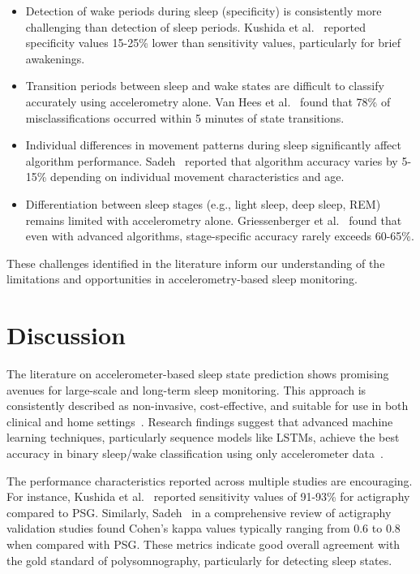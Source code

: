 \documentclass[conference]{IEEEtran}
\begin{document}
\begin{itemize}
	\item Detection of wake periods during sleep (specificity) is consistently more challenging than detection of sleep periods. Kushida et al.~\cite{kushida2001} reported specificity values 15-25\% lower than sensitivity values, particularly for brief awakenings.

	\item Transition periods between sleep and wake states are difficult to classify accurately using accelerometry alone. Van Hees et al.~\cite{vanHees2015} found that 78\% of misclassifications occurred within 5 minutes of state transitions.

	\item Individual differences in movement patterns during sleep significantly affect algorithm performance. Sadeh~\cite{sadeh2011} reported that algorithm accuracy varies by 5-15\% depending on individual movement characteristics and age.

	\item Differentiation between sleep stages (e.g., light sleep, deep sleep, REM) remains limited with accelerometry alone. Griessenberger et al.~\cite{griessenberger2013} found that even with advanced algorithms, stage-specific accuracy rarely exceeds 60-65\%.
\end{itemize}

These challenges identified in the literature inform our understanding of the limitations and opportunities in accelerometry-based sleep monitoring.

\section{Discussion}

The literature on accelerometer-based sleep state prediction shows promising avenues for large-scale and long-term sleep monitoring. This approach is consistently described as non-invasive, cost-effective, and suitable for use in both clinical and home settings~\cite{pmc4883440, researchgate2021, sadeh2011, littner2003}. Research findings suggest that advanced machine learning techniques, particularly sequence models like LSTMs, achieve the best accuracy in binary sleep/wake classification using only accelerometer data~\cite{zhang2020machine, behar2013}.

The performance characteristics reported across multiple studies are encouraging. For instance, Kushida et al.~\cite{kushida2001} reported sensitivity values of 91-93\% for actigraphy compared to PSG. Similarly, Sadeh~\cite{sadeh2011} in a comprehensive review of actigraphy validation studies found Cohen's kappa values typically ranging from 0.6 to 0.8 when compared with PSG. These metrics indicate good overall agreement with the gold standard of polysomnography, particularly for detecting sleep states.
\end{document}
